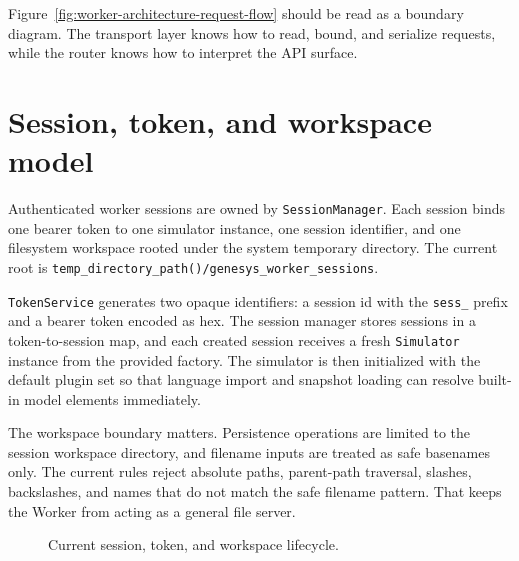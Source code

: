 Figure~\ref{fig:worker-architecture-request-flow} should be read as a boundary diagram. The transport layer knows how to read, bound, and serialize requests, while the router knows how to interpret the API surface.

\section{Session, token, and workspace model}
\label{sec:worker-architecture-session-model}

Authenticated worker sessions are owned by \texttt{SessionManager}. Each session binds one bearer token to one simulator instance, one session identifier, and one filesystem workspace rooted under the system temporary directory. The current root is \texttt{temp\_directory\_path()/genesys\_worker\_sessions}.

\texttt{TokenService} generates two opaque identifiers: a session id with the \texttt{sess\_} prefix and a bearer token encoded as hex. The session manager stores sessions in a token-to-session map, and each created session receives a fresh \texttt{Simulator} instance from the provided factory. The simulator is then initialized with the default plugin set so that language import and snapshot loading can resolve built-in model elements immediately.

The workspace boundary matters. Persistence operations are limited to the session workspace directory, and filename inputs are treated as safe basenames only. The current rules reject absolute paths, parent-path traversal, slashes, backslashes, and names that do not match the safe filename pattern. That keeps the Worker from acting as a general file server.

\begin{figure}[htbp]
\centering
\caption{Current session, token, and workspace lifecycle.}
\label{fig:worker-architecture-session-flow}
\end{figure}

